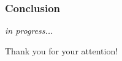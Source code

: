 \documentclass{beamer}
\begin{document}
	\begin{frame}
		\frametitle{Conclusion}
		
		\begin{center}
			\huge {} \textit{in progress...}
		\end{center}
		
	\end{frame}
	
	
	\begin{frame}[plain,c]
		
		\begin{center}
			\huge {} Thank you for your attention!
		\end{center}
		
	\end{frame}
\end{document}
